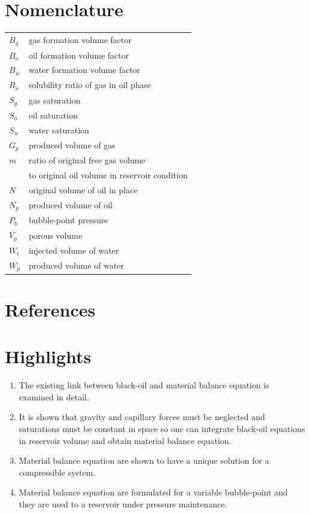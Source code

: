\documentclass[final,authoryear,5p,times,twocolumn,10pt]{elsarticle}
\begin{document}
\section*{Nomenclature}
\begin{tabular}{ll}
$B_g$ & gas formation volume factor\\
$B_o$ & oil formation volume factor\\
$B_w$ & water formation volume factor\\
$R_s$ & solubility ratio of gas in oil phase\\
$S_g$ & gas saturation \\
$S_o$ & oil saturation \\
$S_w$ & water saturation \\
$G_p$ & produced volume of gas \\
$m$ & ratio of original free gas volume \\
& to original oil volume in reservoir condition \\
$N$ & original volume of oil in place \\
$N_p$ & produced volume of oil \\
$P_b$ & bubble-point pressure \\
$V_p$ & porous volume \\
$W_i$ & injected volume of water \\
$W_p$ & produced volume of water
\end{tabular}
\section*{References}


\cite{*}

\section*{Highlights}
\begin{enumerate}[1.]
\item The existing link between black-oil and material balance equation is examined in detail.
\item It is shown that gravity and capillary forces must be neglected and saturations must be constant in space so one can integrate black-oil equations in reservoir volume and obtain material balance equation.
\item Material balance equation are shown to have a unique solution for a compressible system.
\item Material balance equation are formulated for a variable bubble-point and they are used to a reservoir under pressure maintenance.
\end{enumerate}
\end{document}
